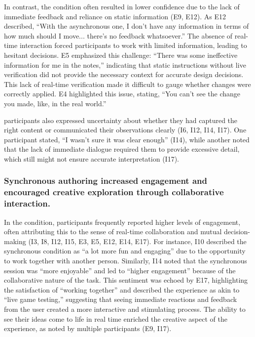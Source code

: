 In contrast, the \async condition often resulted in lower confidence due to the lack of immediate feedback and reliance on static information (E9, E12). As E12 described, ``With the asynchronous one, I don't have any information in terms of how much should I move... there's no feedback whatsoever.'' The absence of real-time interaction forced participants to work with limited information, leading to hesitant decisions. E5 emphasized this challenge: ``There was some ineffective information for me in the notes,'' indicating that static instructions without live verification did not provide the necessary context for accurate design decisions. This lack of real-time verification made it difficult to gauge whether changes were correctly applied. E4 highlighted this issue, stating, ``You can't see the change you made, like, in the real world.'' 

\Insitu participants also expressed uncertainty about whether they had captured the right content or communicated their observations clearly (I6, I12, I14, I17). One \insitu participant stated, ``I wasn't sure it was clear enough'' (I14), while another noted that the lack of immediate dialogue required them to provide excessive detail, which still might not ensure accurate interpretation (I17).

\subsubsection{\textbf{Synchronous authoring increased engagement and encouraged creative exploration through collaborative interaction.}}\label{sec:results:interviews:engagement}

In the \sync condition, participants frequently reported higher levels of engagement, often attributing this to the sense of real-time collaboration and mutual decision-making (I3, I8, I12, I15, E3, E5, E12, E14, E17). 
For instance, I10 described the synchronous condition as ``a lot more fun and engaging'' due to the opportunity to work together with another person. Similarly, I14 noted that the synchronous session was ``more enjoyable'' and led to ``higher engagement'' because of the collaborative nature of the task. This sentiment was echoed by E17, highlighting the satisfaction of ``working together'' and described the experience as akin to ``live game testing,'' suggesting that seeing immediate reactions and feedback from the \insitu user created a more interactive and stimulating process. The ability to see their ideas come to life in real time enriched the creative aspect of the experience, as noted by multiple participants (E9, I17).

